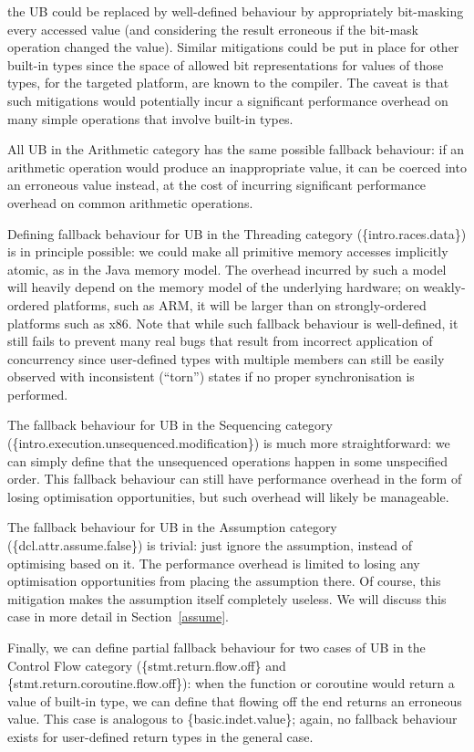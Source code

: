 {the UB could be replaced by well-defined behaviour by appropriately bit-masking every accessed  value (and considering the result erroneous if the bit-mask operation changed the value). Similar mitigations could be put in place for other built-in types since the space of allowed bit representations for values of those types, for the targeted platform, are known to the compiler. The caveat is that such mitigations would potentially incur a significant performance overhead on many simple operations that involve built-in types.

All UB in the Arithmetic category has the same possible fallback behaviour: if an arithmetic operation would produce an inappropriate value, it can be coerced into an erroneous value instead, at the cost of incurring significant performance overhead on common arithmetic operations.

Defining fallback behaviour for UB in the Threading category (\{intro.races.data\}) is in principle possible: we could make all primitive memory accesses implicitly atomic, as in the Java memory model. The overhead incurred by such a model will heavily depend on the memory model of the underlying hardware; on weakly-ordered platforms, such as ARM,
it will be larger than on strongly-ordered platforms such as x86. Note that while such fallback behaviour is well-defined, it still fails to prevent many real bugs that result from incorrect application of concurrency since user-defined types with multiple members can still be easily observed with inconsistent (``torn'') states if no proper synchronisation is performed.

The fallback behaviour for UB in the Sequencing category (\{intro.execution.unsequenced.modifica\-tion\})
is much more straightforward: we can simply define that the unsequenced operations happen in some unspecified order. This fallback behaviour can still have performance overhead in the form of losing  optimisation opportunities, but such overhead will likely be manageable. 

The fallback behaviour for UB in the Assumption category (\{dcl.attr.assume.false\}) is trivial: just ignore the assumption, instead of optimising based on it. The performance overhead is limited to losing any optimisation opportunities from placing the assumption there. Of course, this mitigation makes the assumption itself completely useless. We will discuss this case in more detail in Section~\ref{assume}.

Finally, we can define partial fallback behaviour for two cases of UB in the Control Flow category  (\{stmt.return.flow.off\} and \{stmt.return.coroutine.flow.off\}): when the function or coroutine would return a value of built-in type, we can define that flowing off the end returns an erroneous value. This case is analogous to \{basic.indet.value\}; again, no fallback behaviour exists for user-defined return types in the general case.

}
